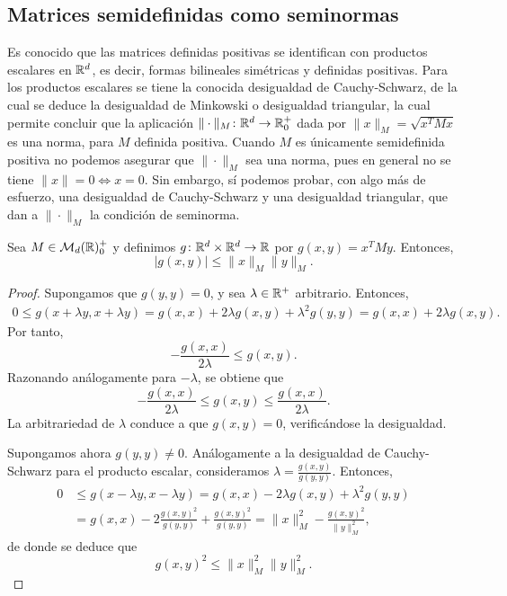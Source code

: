 \subsection{Matrices semidefinidas como seminormas}

Es conocido que las matrices definidas positivas se identifican con productos escalares en $\mathbb{R}^d$, es decir, formas bilineales simétricas y definidas positivas. Para los productos escalares se tiene la conocida desigualdad de Cauchy-Schwarz, de la cual se deduce la desigualdad de Minkowski o desigualdad triangular, la cual permite concluir que la aplicación $\|\cdot\|_M \colon \mathbb{R}^d \to \mathbb{R}^+_0$ dada por $\|x\|_M = \sqrt{x^TMx}$ es una norma, para $M$ definida positiva. Cuando $M$ es únicamente semidefinida positiva no podemos asegurar que $\|\cdot\|_M$ sea una norma, pues en general no se tiene $\|x\| = 0 \iff x = 0$. Sin embargo, sí podemos probar, con algo más de esfuerzo, una desigualdad de Cauchy-Schwarz y una desigualdad triangular, que dan a $\|\cdot\|_M$ la condición de seminorma.

\begin{thm} \label{thm:cauchy_schwarz}
    Sea $M \in \mathcal{M}_d(\mathbb{R})^+_0$ y definimos $g \colon \mathbb{R}^d \times \mathbb{R}^d \to \mathbb{R}$ por $g(x,y) = x^TMy$. Entonces,
    \[ |g(x,y)| \le \|x\|_M\|y\|_M. \]
\end{thm}
\begin{proof}
    Supongamos que $g(y,y)=0$, y sea $\lambda \in \mathbb{R}^+$ arbitrario. Entonces,
    \begin{align*}
        0 \le g(x + \lambda y, x+\lambda y) = g(x,x) + 2\lambda g(x,y) + \lambda^2 g(y,y) = g(x,x) + 2\lambda g(x,y).
    \end{align*}
    Por tanto,
    \[ - \frac{g(x,x)}{2\lambda} \le g(x,y). \]
    Razonando análogamente para $-\lambda$, se obtiene que
    \[ - \frac{g(x,x)}{2\lambda} \le g(x,y) \le \frac{g(x,x)}{2\lambda}.\]
    La arbitrariedad de $\lambda$ conduce a que $g(x,y)=0$, verificándose la desigualdad.

    Supongamos ahora $g(y,y) \ne 0$. Análogamente a la desigualdad de Cauchy-Schwarz para el producto escalar, consideramos $\lambda = \frac{g(x,y)}{g(y,y)}$. Entonces,
    \begin{align*}
        0 &\le g(x - \lambda y, x - \lambda y) = g(x,x) - 2\lambda g(x,y) + \lambda^2g(y,y) \\
          &= g(x,x) - 2 \frac{g(x,y)^2}{g(y,y)}+\frac{g(x,y)^2}{g(y,y)} = \|x\|_M^2 - \frac{g(x,y)^2}{\|y\|_M^2},
    \end{align*}
    de donde se deduce que
    \[ g(x,y)^2 \le \|x\|_M^2\|y\|_M^2. \]
\end{proof}

